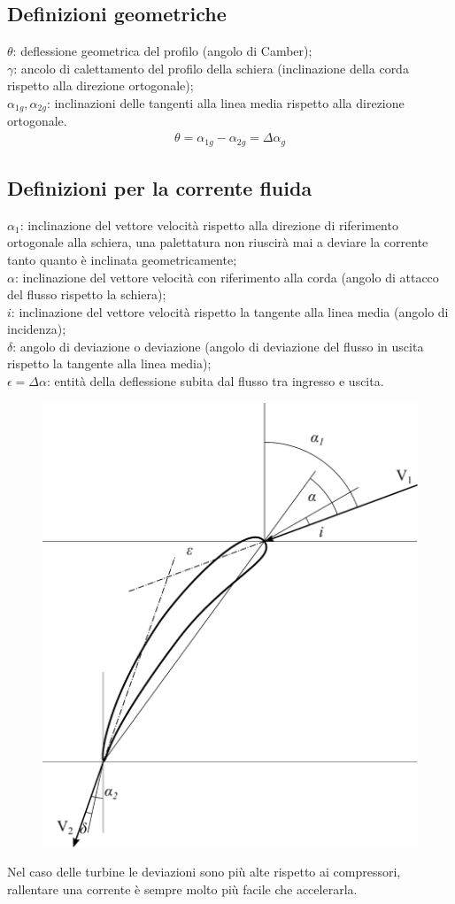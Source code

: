 \subsection{Definizioni geometriche}
$\theta$: deflessione geometrica del profilo (angolo di Camber);\\
$\gamma$: ancolo di calettamento del profilo della schiera (inclinazione della corda rispetto alla direzione ortogonale);\\
$\alpha_{1g}, \alpha_{2g}$: inclinazioni delle tangenti alla linea media rispetto alla direzione ortogonale.
\begin{align*}
\theta = \alpha_{1g} - \alpha_{2g} = \Delta \alpha_{g}
\end{align*}

\subsection{Definizioni per la corrente fluida}
$\alpha_1$: inclinazione del vettore velocità rispetto alla direzione di riferimento ortogonale alla schiera, una palettatura non riuscirà mai a deviare la corrente tanto quanto è inclinata geometricamente;\\
$\alpha$: inclinazione del vettore velocità con riferimento alla corda (angolo di attacco del flusso rispetto la schiera);\\
$i$: inclinazione del vettore velocità rispetto la tangente alla linea media (angolo di incidenza);\\
$\delta$: angolo di deviazione o deviazione (angolo di deviazione del flusso in uscita rispetto la tangente alla linea media);\\
$\epsilon = \Delta \alpha$: entità della deflessione subita dal flusso tra ingresso e uscita.
\begin{figure}
\centering
  \includegraphics[width=.35\textwidth]{fig/palasing.pdf}
\caption{}
\label{fig:palasing}
\end{figure}
Nel caso delle turbine le deviazioni sono più alte rispetto ai compressori, rallentare una corrente è sempre molto più facile che accelerarla. 

